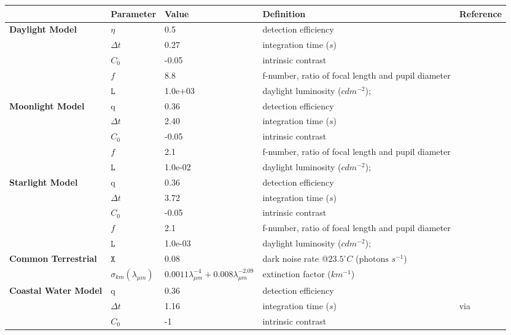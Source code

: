 \begin{tabular}{|L{3.5cm}|L{2cm}|L{2cm}|L{4.5cm}|L{4.5cm}|}
\hline
\textbf{ }&\textbf{Parameter}&\textbf{Value}&\textbf{Definition}&\textbf{Reference}\\\hline
\textbf{Daylight Model}&$\eta$&0.5&detection efficiency&\cite{Pirh07a}\\\hline
 &$\Delta t$&0.27&integration time ($s$)&\cite{Donn95a}\\\hline
 &$C_{0}$&-0.05&intrinsic contrast&\cite{Blac46a}\\\hline
 &$f$&8.8&f-number, ratio of focal length and pupil diameter&\cite{Mill79a}\\\hline
 &$\mathtt{L}$&1.0e+03&daylight luminosity ($cd m^{-2}$);&\cite{Midd52a}\\\hline
\textbf{Moonlight Model}&q&0.36&detection efficiency&\cite{Nils14a}\\\hline
 &$\Delta t$&2.40&integration time ($s$)&\cite{Donn95a}\\\hline
 &$C_{0}$&-0.05&intrinsic contrast&\cite{Blac46a}\\\hline
 &$f$&2.1&f-number, ratio of focal length and pupil diameter&\cite{Mill79a}\\\hline
 &$\mathtt{L}$&1.0e-02&daylight luminosity ($cd m^{-2}$);&\cite{Midd52a}\\\hline
\textbf{Starlight Model}&q&0.36&detection efficiency&\cite{Nils14a}\\\hline
 &$\Delta t$&3.72&integration time ($s$)&\cite{Donn95a}\\\hline
 &$C_{0}$&-0.05&intrinsic contrast&\cite{Blac46a}\\\hline
 &$f$&2.1&f-number, ratio of focal length and pupil diameter&\cite{Mill79a}\\\hline
 &$\mathtt{L}$&1.0e-03&daylight luminosity ($cd m^{-2}$);&\cite{Midd52a}\\\hline
\textbf{Common Terrestrial}&$\mathtt{X}$&0.08&dark noise rate @$23.5^{\circ} C$ ($\text{photons } s^{-1}$)&\cite{Aho93a}\\\hline
 &$\sigma_{km} (\lambda_{\mu m})$&$0.0011 \lambda_{\mu m}^{-4} + 0.008 \lambda_{\mu m}^{-2.09}$&extinction factor ($km^{-1}$)&\cite{Midd52a}\\\hline
\textbf{Coastal Water Model}&q&0.36&detection efficiency&\cite{Nils14a}\\\hline
 &$\Delta t$&1.16&integration time ($s$)&\cite{Donn95a} via \cite{Nils14a}\\\hline
 &$C_{0}$&-1&intrinsic contrast&\cite{Nils14a}\\\hline

\end{tabular}
